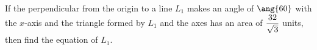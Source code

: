 



\question[4] If the perpendicular from the origin to a line $L_1$ makes an angle of $\ang{\vd}$ 
with the $x$-axis and the triangle formed by $L_1$ and the axes has an area of $\dfrac{32}{\sqrt{3}}$ units,
then find the equation of $L_1$.

\watchout

